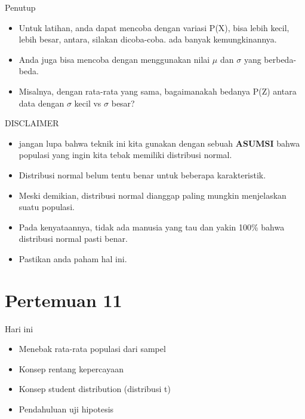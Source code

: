 \documentclass[
  ignorenonframetext,
]{beamer}
\begin{document}
\begin{frame}{Penutup}
\label{penutup-1}
\begin{itemize}
\item
  Untuk latihan, anda dapat mencoba dengan variasi P(X), bisa lebih
  kecil, lebih besar, antara, silakan dicoba-coba. ada banyak
  kemungkinannya.
\item
  Anda juga bisa mencoba dengan menggunakan nilai \(\mu\) dan \(\sigma\)
  yang berbeda-beda.
\item
  Misalnya, dengan rata-rata yang sama, bagaimanakah bedanya P(Z) antara
  data dengan \(\sigma\) kecil vs \(\sigma\) besar?
\end{itemize}
\end{frame}

\begin{frame}{DISCLAIMER}
\label{disclaimer}
\begin{itemize}
\item
  jangan lupa bahwa teknik ini kita gunakan dengan sebuah
  \textbf{ASUMSI} bahwa populasi yang ingin kita tebak memiliki
  distribusi normal.
\item
  Distribusi normal belum tentu benar untuk beberapa karakteristik.
\item
  Meski demikian, distribusi normal dianggap paling mungkin menjelaskan
  suatu populasi.
\item
  Pada kenyataannya, tidak ada manusia yang tau dan yakin 100\% bahwa
  distribusi normal pasti benar.
\item
  Pastikan anda paham hal ini.
\end{itemize}
\end{frame}

\section{Pertemuan 11}\label{pertemuan-11}

\begin{frame}{Hari ini}
\label{hari-ini-1}
\begin{itemize}
\item
  Menebak rata-rata populasi dari sampel
\item
  Konsep rentang kepercayaan
\item
  Konsep student distribution (distribusi t)
\item
  Pendahuluan uji hipotesis
\end{itemize}
\end{frame}
\end{document}
